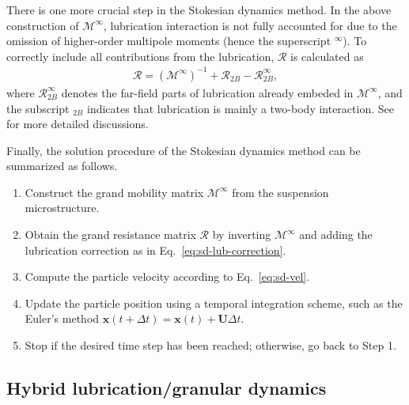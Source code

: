 There is one more crucial step in the Stokesian dynamics method.
In the above construction of $\mathscr{M}^\infty$, lubrication interaction is not fully accounted for due to the omission of higher-order multipole moments (hence the superscript $^\infty$). To correctly include all contributions from the lubrication, $\mathscr{R}$ is calculated as
\begin{equation} \label{eq:sd-lub-correction}
 \begin{aligned}
  \mathscr{R} = (\mathscr{M}^\infty)^{-1} +\mathscr{R}_{2B} - \mathscr{R}_{2B}^\infty,
 \end{aligned}
\end{equation}
where $\mathscr{R}_{2B}^\infty$ denotes the far-field parts of lubrication already embeded in $\mathscr{M}^\infty$, and the subscript $_{2B}$ indicates that lubrication is mainly a two-body interaction. See \cite{durlofsky_brady_bossis_1987, Brady_Bossis1988} for more detailed discussions.  

Finally, the solution procedure of the Stokesian dynamics method can be summarized as follows.
\begin{enumerate}
\item Construct the grand mobility matrix $\mathscr{M}^\infty$ from the suspension microstructure.
\item Obtain the grand resistance matrix $\mathscr{R}$ by inverting $\mathscr{M}^\infty$ and adding the lubrication correction as in Eq.\ \eqref{eq:sd-lub-correction}.
\item Compute the particle velocity according to Eq.\ \eqref{eq:sd-vel}.
\item Update the particle position using a temporal integration scheme, such as the Euler's method $\bm{x}(t+\Delta t)= \bm{x}(t) +\bm{U} \Delta t$.
\item Stop if the desired time step has been reached; otherwise, go back to Step 1.
\end{enumerate}


\subsection{Hybrid lubrication/granular dynamics}

